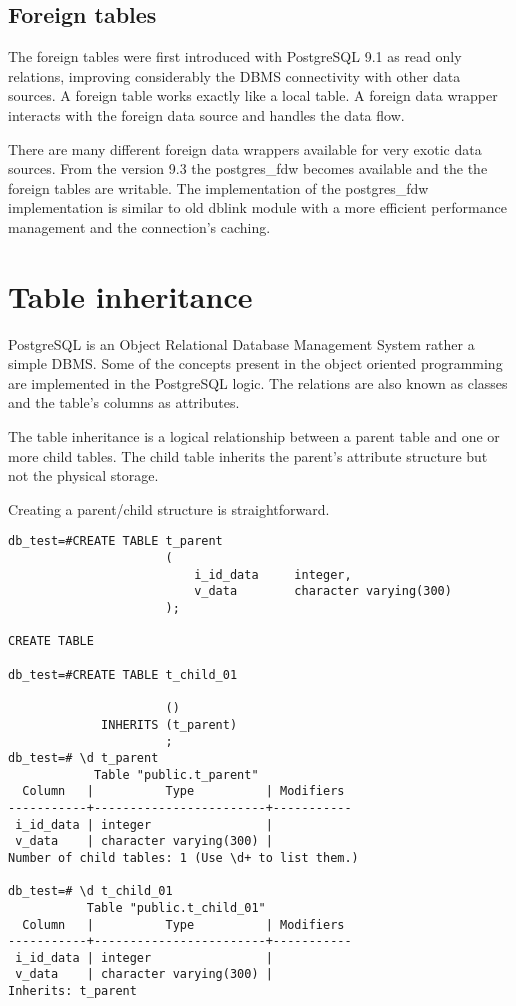 \subsection{Foreign tables}
The foreign tables were first introduced with PostgreSQL 9.1 as read only relations, improving 
considerably the DBMS connectivity with other data sources. A foreign table works exactly like a
local table. A foreign data wrapper interacts with the foreign data source and handles the
data flow.\newline

There are many different foreign data wrappers available for very exotic data sources. From the
version 9.3 the postgres\_fdw becomes available and the the foreign tables are writable. The
implementation of the postgres\_fdw implementation is similar to old dblink module with a more
efficient performance management and the connection's caching.

\section{Table inheritance}
PostgreSQL is an Object Relational Database Management System rather a simple DBMS. Some of the
concepts present in the object oriented programming are implemented in the PostgreSQL logic. The
relations are also known as classes and the table's columns as attributes. \newline

The table inheritance is a logical relationship between a parent table and one or more child 
tables. The child table inherits the parent's attribute structure but not the physical
storage.\newline 


Creating a parent/child structure is straightforward.

\begin{lstlisting}[style=pgsql]
db_test=#CREATE TABLE t_parent
                      (
                          i_id_data     integer,
                          v_data        character varying(300)
                      );

CREATE TABLE                     

db_test=#CREATE TABLE t_child_01
                      
                      ()
             INHERITS (t_parent)
                      ;                      
db_test=# \d t_parent
            Table "public.t_parent"
  Column   |          Type          | Modifiers 
-----------+------------------------+-----------
 i_id_data | integer                | 
 v_data    | character varying(300) | 
Number of child tables: 1 (Use \d+ to list them.)

db_test=# \d t_child_01 
           Table "public.t_child_01"
  Column   |          Type          | Modifiers 
-----------+------------------------+-----------
 i_id_data | integer                | 
 v_data    | character varying(300) | 
Inherits: t_parent

\end{lstlisting}

